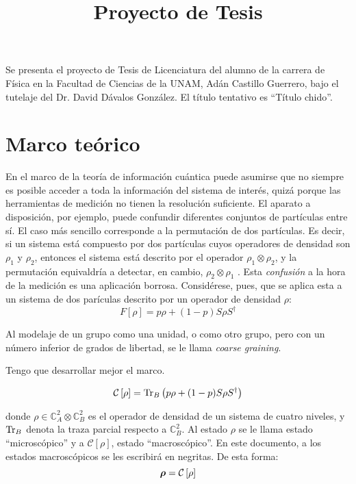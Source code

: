 \documentclass[onecolumn,11pt]{article}
\title{Proyecto de Tesis} \date{}
\newcommand{\Cc}{\mathcal{C}} %
\newcommand{\Hh}{\mathbb{C}} %
\newcommand{\CG}[1]{\Cc\left[#1\right]}
\newcommand*{\B}[1]{\ifmmode\bm{#1}\else\textbf{#1}\fi}
\begin{document}
\maketitle
\thispagestyle{empty}
Se presenta el proyecto de Tesis de Licenciatura del alumno de la carrera de Física en la Facultad de Ciencias de la UNAM, Adán Castillo Guerrero, bajo el tutelaje del Dr. David Dávalos González. El título tentativo es ``Título chido''.

\section{Marco teórico}


En el marco de la teoría de información cuántica puede asumirse que no siempre es posible acceder a toda la información del sistema de interés, quizá porque las herramientas de medición no tienen la resolución suficiente. El aparato a disposición, por ejemplo, puede confundir diferentes conjuntos de partículas entre sí. El caso más sencillo corresponde a la permutación de dos partículas. Es decir, si un sistema está compuesto por dos partículas cuyos operadores de densidad son $\rho_{1}$ y $\rho_{2}$, entonces el sistema está descrito por el operador $\rho_{1}\otimes\rho_{2}$, y la permutación equivaldría a detectar, en cambio, $\rho_{2}\otimes\rho_{1}$ \cite{FuzzyMeasurements}. Esta \textit{confusión} a la hora de la medición es una aplicación borrosa. Considérese, pues, que se aplica esta a un sistema de dos parículas descrito por un operador de densidad $\rho$:
\begin{equation}\label{eq:Fuzzy2}
F[\rho]=p\rho+(1-p)S\rho S^{\dag}
\end{equation}


Al modelaje de un grupo como una unidad, o como otro grupo, pero con un número inferior de grados de libertad, se le llama \textit{coarse graining}.


Tengo que desarrollar mejor el marco.

\begin{equation}\label{eq:CG}
    \Cc\left[\rho\right]=\Tr_{B}\left(p\rho+(1-p)S\rho S^{\dag}\right)
\end{equation}

donde $\rho\in \Hh^{2}_{A}\otimes \Hh^{2}_{B}$ es el operador de densidad de un sistema de cuatro niveles, y $\Tr_{B}$ denota la traza parcial respecto a $\Hh^{2}_{B}$. Al estado $\rho$ se le llama estado ``microscópico'' y a $\CG{\rho}$, estado ``macroscópico''. En este documento, a los estados macroscópicos se les escribirá en negritas. De esta forma:
\begin{equation}
    \B{\rho}=\CG{\rho}
\end{equation}
\end{document}
